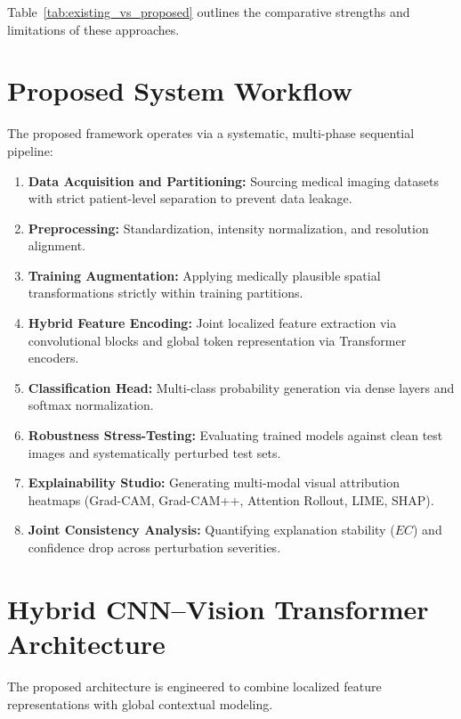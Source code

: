 \documentclass[conference]{IEEEtran}
\begin{document}
Table~\ref{tab:existing_vs_proposed} outlines the comparative strengths and limitations of these approaches.

\section{Proposed System Workflow}
\label{sec:proposed_system}

The proposed framework operates via a systematic, multi-phase sequential pipeline:
\begin{enumerate}
    \item \textbf{Data Acquisition and Partitioning:} Sourcing medical imaging datasets with strict patient-level separation to prevent data leakage.
    \item \textbf{Preprocessing:} Standardization, intensity normalization, and resolution alignment.
    \item \textbf{Training Augmentation:} Applying medically plausible spatial transformations strictly within training partitions.
    \item \textbf{Hybrid Feature Encoding:} Joint localized feature extraction via convolutional blocks and global token representation via Transformer encoders.
    \item \textbf{Classification Head:} Multi-class probability generation via dense layers and softmax normalization.
    \item \textbf{Robustness Stress-Testing:} Evaluating trained models against clean test images and systematically perturbed test sets.
    \item \textbf{Explainability Studio:} Generating multi-modal visual attribution heatmaps (Grad-CAM, Grad-CAM++, Attention Rollout, LIME, SHAP).
    \item \textbf{Joint Consistency Analysis:} Quantifying explanation stability ($EC$) and confidence drop across perturbation severities.
\end{enumerate}

\section{Hybrid CNN--Vision Transformer Architecture}
\label{sec:architecture}

The proposed architecture is engineered to combine localized feature representations with global contextual modeling.
\end{document}
